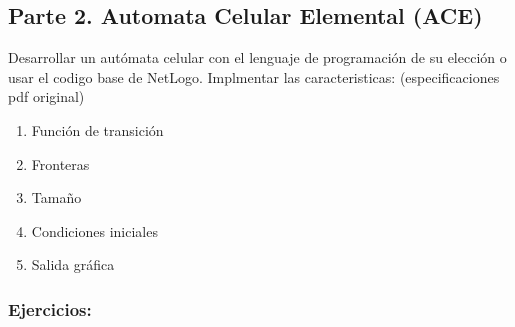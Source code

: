 \documentclass[12pt]{article}
\begin{document}
{\color{blue} \subsection*{Parte 2. Automata Celular Elemental (ACE)}}
\vspace{1em}

Desarrollar un autómata celular con el lenguaje de programación de su elección o usar el codigo base de NetLogo. Implmentar las caracteristicas: (especificaciones pdf original)\\

\begin{enumerate}
    \item Función de transición
    \item Fronteras
    \item Tamaño
    \item Condiciones iniciales
    \item Salida gráfica
\end{enumerate}
{\color{blue} \subsubsection*{Ejercicios:}}
\end{document}
